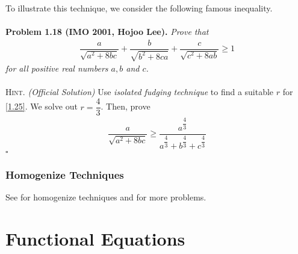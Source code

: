\documentclass[a4paper,oneside]{article}
\numberwithin{equation}{section}
\begin{document}
To illustrate this technique, we consider the following famous inequality.\\
\\
\textbf{Problem 1.18 (IMO 2001, Hojoo Lee).} \textit{Prove that}
\begin{align}
\dfrac{a}{{\sqrt {{a^2} + 8bc} }} + \dfrac{b}{{\sqrt {{b^2} + 8ca} }} + \dfrac{c}{{\sqrt {{c^2} + 8ab} }} \ge 1
\end{align}
\textit{for all positive real numbers $a,b$ and $c$.}\\
\\
\textsc{Hint.} \textit{(Official Solution)} Use \textit{isolated fudging technique} to find a suitable $r$ for \eqref{1.25}. We solve out $r=\dfrac{4}{3}$. Then, prove
\begin{align}
\dfrac{a}{{\sqrt {{a^2} + 8bc} }} \ge \dfrac{{{a^{\dfrac{4}{3}}}}}{{{a^{\dfrac{4}{3}}} + {b^{\dfrac{4}{3}}} + {c^{\dfrac{4}{3}}}}}
\end{align}
\hfill $\square$
\subsubsection{Homogenize Techniques}
See \cite{1} for homogenize techniques and \cite{2} for more problems.
\section{Functional Equations}
\end{document}
